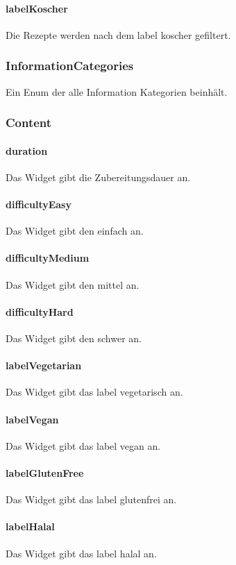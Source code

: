 \documentclass{entwurfsheft}
\begin{document}
\paragraph*{labelKoscher} Die Rezepte werden nach dem \gls{label} koscher gefiltert.


\subsubsection{InformationCategories}\label{sec:InformationCategories}
Ein Enum der alle Information Kategorien beinhält.
\subsubsection*{Content}
\paragraph*{duration} Das Widget gibt die Zubereitungsdauer an.
\paragraph*{difficultyEasy} Das Widget gibt den  einfach an.
\paragraph*{difficultyMedium} Das Widget gibt den  mittel an.
\paragraph*{difficultyHard} Das Widget gibt den  schwer an.
\paragraph*{labelVegetarian} Das Widget gibt das \gls{label} vegetarisch an.
\paragraph*{labelVegan} Das Widget gibt das \gls{label} vegan an.
\paragraph*{labelGlutenFree} Das Widget gibt das \gls{label} glutenfrei an.
\paragraph*{labelHalal} Das Widget gibt das \gls{label} halal an.
\end{document}

